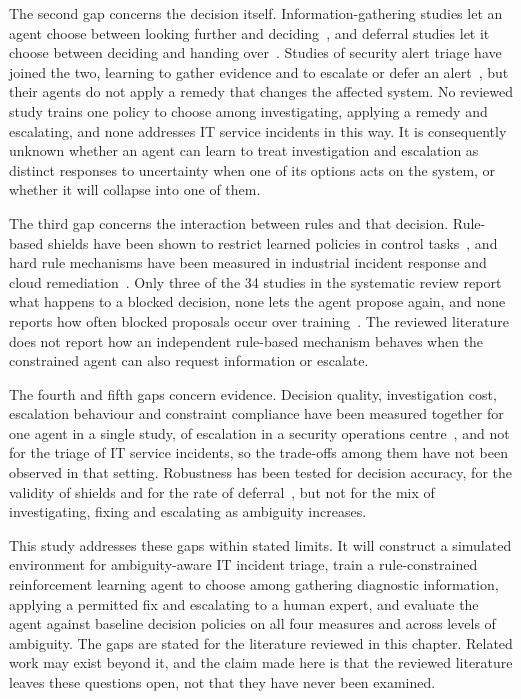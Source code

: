 The second gap concerns the decision itself. Information-gathering studies let an agent choose between looking further and deciding~\cite{janisch2019,kim2025}, and deferral studies let it choose between deciding and handing over~\cite{madras2018,joshi2023,zhang2026falcon}. Studies of security alert triage have joined the two, learning to gather evidence and to escalate or defer an alert~\cite{sahin2026,kovtun2026}, but their agents do not apply a remedy that changes the affected system. No reviewed study trains one policy to choose among investigating, applying a remedy and escalating, and none addresses IT service incidents in this way. It is consequently unknown whether an agent can learn to treat investigation and escalation as distinct responses to uncertainty when one of its options acts on the system, or whether it will collapse into one of them.

The third gap concerns the interaction between rules and that decision. Rule-based shields have been shown to restrict learned policies in control tasks~\cite{alshiekh2018,konighofer2025}, and hard rule mechanisms have been measured in industrial incident response and cloud remediation~\cite{ravi2025,singh2026}. Only three of the 34 studies in the systematic review report what happens to a blocked decision, none lets the agent propose again, and none reports how often blocked proposals occur over training~\cite{opol2026slr}. The reviewed literature does not report how an independent rule-based mechanism behaves when the constrained agent can also request information or escalate.

The fourth and fifth gaps concern evidence. Decision quality, investigation cost, escalation behaviour and constraint compliance have been measured together for one agent in a single study, of escalation in a security operations centre~\cite{kovtun2026}, and not for the triage of IT service incidents, so the trade-offs among them have not been observed in that setting. Robustness has been tested for decision accuracy, for the validity of shields and for the rate of deferral~\cite{kim2025,hammar2025,hamel2026,sahin2026}, but not for the mix of investigating, fixing and escalating as ambiguity increases.

This study addresses these gaps within stated limits. It will construct a simulated environment for ambiguity-aware IT incident triage, train a rule-constrained reinforcement learning agent to choose among gathering diagnostic information, applying a permitted fix and escalating to a human expert, and evaluate the agent against baseline decision policies on all four measures and across levels of ambiguity. The gaps are stated for the literature reviewed in this chapter. Related work may exist beyond it, and the claim made here is that the reviewed literature leaves these questions open, not that they have never been examined.

